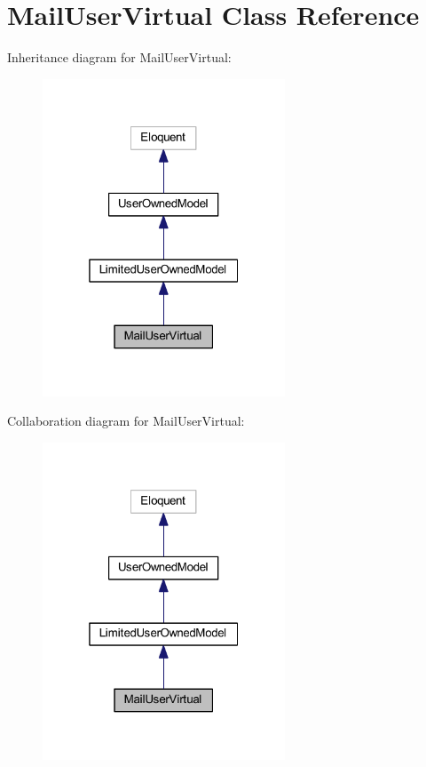 \hypertarget{class_mail_user_virtual}{}\section{Mail\+User\+Virtual Class Reference}
\label{class_mail_user_virtual}


Inheritance diagram for Mail\+User\+Virtual\+:
\nopagebreak
\begin{figure}[H]
\begin{center}
\leavevmode
\includegraphics[width=205pt]{class_mail_user_virtual__inherit__graph}
\end{center}
\end{figure}


Collaboration diagram for Mail\+User\+Virtual\+:
\nopagebreak
\begin{figure}[H]
\begin{center}
\leavevmode
\includegraphics[width=205pt]{class_mail_user_virtual__coll__graph}
\end{center}
\end{figure}
